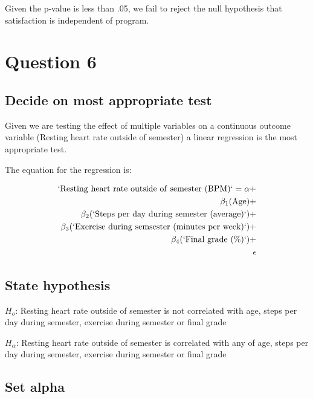 \documentclass[preprint, 3p,
authoryear]{elsarticle} %
\begin{document}
Given the p-value is less than .05, we fail to reject the null
hypothesis that satisfaction is independent of program.

\hypertarget{question-6}{%
\section{Question 6}\label{question-6}}

\hypertarget{decide-on-most-appropriate-test-2}{%
\subsection{Decide on most appropriate
test}\label{decide-on-most-appropriate-test-2}}

Given we are testing the effect of multiple variables on a continuous
outcome variable (Resting heart rate outside of semester) a linear
regression is the most appropriate test.

The equation for the regression is:

\[
\begin{split}
\operatorname{`Resting\ heart\ rate\ outside\ of\ semester\ (BPM)`} = \alpha +\\ \beta_{1}(\operatorname{Age}) +\\ \beta_{2}(\operatorname{`Steps\ per\ day\ during\ semester\ (average)`}) +\\ \beta_{3}(\operatorname{`Exercise\ during\ semsester\ (minutes\ per\ week)`}) +\\ \beta_{4}(\operatorname{`Final\ grade\ (\%)`}) +\\ \epsilon
\end{split}
\]

\hypertarget{state-hypothesis-3}{%
\subsection{State hypothesis}\label{state-hypothesis-3}}

\(H_o\): Resting heart rate outside of semester is not correlated with
age, steps per day during semester, exercise during semester or final
grade

\(H_\alpha\): Resting heart rate outside of semester is correlated with
any of age, steps per day during semester, exercise during semester or
final grade

\hypertarget{set-alpha-3}{%
\subsection{Set alpha}\label{set-alpha-3}}
\end{document}
